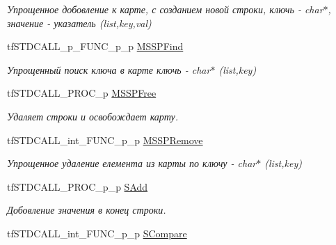 \begin{DoxyCompactItemize}
\begin{DoxyCompactList}\small\item\em Упрощенное добовление к карте, с созданием новой строки, ключь -\/ char$\ast$, значение -\/ указатель (list,key,val) \end{DoxyCompactList}\item 
\hypertarget{structs_functions_array_c_p_u_afb5dcb7e75377e1d8c060f1cd6bf5306}{tf\-S\-T\-D\-C\-A\-L\-L\-\_\-p\-\_\-\-F\-U\-N\-C\-\_\-p\-\_\-p \hyperlink{structs_functions_array_c_p_u_afb5dcb7e75377e1d8c060f1cd6bf5306}{M\-S\-S\-P\-Find}}\label{structs_functions_array_c_p_u_afb5dcb7e75377e1d8c060f1cd6bf5306}

\begin{DoxyCompactList}\small\item\em Упрощенный поиск ключа в карте ключь -\/ char$\ast$ (list,key) \end{DoxyCompactList}\item 
\hypertarget{structs_functions_array_c_p_u_ac1ed0f16e9019cced00cd2392fc507cf}{tf\-S\-T\-D\-C\-A\-L\-L\-\_\-\-P\-R\-O\-C\-\_\-p \hyperlink{structs_functions_array_c_p_u_ac1ed0f16e9019cced00cd2392fc507cf}{M\-S\-S\-P\-Free}}\label{structs_functions_array_c_p_u_ac1ed0f16e9019cced00cd2392fc507cf}

\begin{DoxyCompactList}\small\item\em Удаляет строки и освобождает карту. \end{DoxyCompactList}\item 
\hypertarget{structs_functions_array_c_p_u_aa7333f2c1f93171239faa7c8d9ae7771}{tf\-S\-T\-D\-C\-A\-L\-L\-\_\-int\-\_\-\-F\-U\-N\-C\-\_\-p\-\_\-p \hyperlink{structs_functions_array_c_p_u_aa7333f2c1f93171239faa7c8d9ae7771}{M\-S\-S\-P\-Remove}}\label{structs_functions_array_c_p_u_aa7333f2c1f93171239faa7c8d9ae7771}

\begin{DoxyCompactList}\small\item\em Упрощенное удаление елемента из карты по ключу -\/ char$\ast$ (list,key) \end{DoxyCompactList}\item 
\hypertarget{structs_functions_array_c_p_u_a7afff5a8794f1c573b8e70226dba06c4}{tf\-S\-T\-D\-C\-A\-L\-L\-\_\-\-P\-R\-O\-C\-\_\-p\-\_\-p \hyperlink{structs_functions_array_c_p_u_a7afff5a8794f1c573b8e70226dba06c4}{S\-Add}}\label{structs_functions_array_c_p_u_a7afff5a8794f1c573b8e70226dba06c4}

\begin{DoxyCompactList}\small\item\em Добовление значения в конец строки. \end{DoxyCompactList}\item 
\hypertarget{structs_functions_array_c_p_u_a50a3c095a41c939279662a1526b20623}{tf\-S\-T\-D\-C\-A\-L\-L\-\_\-int\-\_\-\-F\-U\-N\-C\-\_\-p\-\_\-p \hyperlink{structs_functions_array_c_p_u_a50a3c095a41c939279662a1526b20623}{S\-Compare}}\label{structs_functions_array_c_p_u_a50a3c095a41c939279662a1526b20623}


\end{DoxyCompactItemize}
